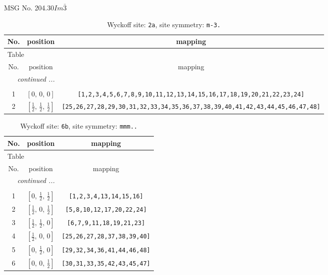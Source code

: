 \documentclass[fleqn,8pt]{jsarticle}
\begin{document}
\setcounter{MaxMatrixCols}{32}

\renewcommand{\tablename}{Table~}
\renewcommand{\figurename}{Figure~}
\begin{center}
\LARGE
MSG No. 204.30\quad$Im\bar{3}$
\end{center}
\renewcommand{\arraystretch}{1.2}
\begin{longtable}{ccc}
\caption{Wyckoff site: {\tt 2a}, site symmetry: {\tt m-3.}}
 \\
 \hline \hline
No. & position & mapping \\ \hline \endfirsthead

\multicolumn{2}{l}{\tablename\ \thetable{}} \\
 \hline \hline
No. & position & mapping \\ \hline \endhead

 \hline \hline
\multicolumn{2}{r}{\footnotesize\it continued ...} \\ \endfoot

 \hline \hline
\multicolumn{2}{r}{} \\ \endlastfoot

1 & $\left[ 0,\, 0,\, 0 \right]$ & {\tt [1,2,3,4,5,6,7,8,9,10,11,12,13,14,15,16,17,18,19,20,21,22,23,24]} \\ \hline
2 & $\left[ \frac{1}{2},\, \frac{1}{2},\, \frac{1}{2} \right]$ & {\tt [25,26,27,28,29,30,31,32,33,34,35,36,37,38,39,40,41,42,43,44,45,46,47,48]} \\
\end{longtable}
\renewcommand{\arraystretch}{1.2}
\begin{longtable}{ccc}
\caption{Wyckoff site: {\tt 6b}, site symmetry: {\tt mmm..}}
 \\
 \hline \hline
No. & position & mapping \\ \hline \endfirsthead

\multicolumn{2}{l}{\tablename\ \thetable{}} \\
 \hline \hline
No. & position & mapping \\ \hline \endhead

 \hline \hline
\multicolumn{2}{r}{\footnotesize\it continued ...} \\ \endfoot

 \hline \hline
\multicolumn{2}{r}{} \\ \endlastfoot

1 & $\left[ 0,\, \frac{1}{2},\, \frac{1}{2} \right]$ & {\tt [1,2,3,4,13,14,15,16]} \\ \hline
2 & $\left[ \frac{1}{2},\, 0,\, \frac{1}{2} \right]$ & {\tt [5,8,10,12,17,20,22,24]} \\ \hline
3 & $\left[ \frac{1}{2},\, \frac{1}{2},\, 0 \right]$ & {\tt [6,7,9,11,18,19,21,23]} \\ \hline
4 & $\left[ \frac{1}{2},\, 0,\, 0 \right]$ & {\tt [25,26,27,28,37,38,39,40]} \\ \hline
5 & $\left[ 0,\, \frac{1}{2},\, 0 \right]$ & {\tt [29,32,34,36,41,44,46,48]} \\ \hline
6 & $\left[ 0,\, 0,\, \frac{1}{2} \right]$ & {\tt [30,31,33,35,42,43,45,47]} \\
\end{longtable}
\end{document}

